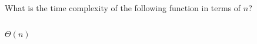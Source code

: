 \begin{prob}
    What is the time complexity of the following function in terms of $n$?

    \inputminted{python}{./code.py}

    \begin{soln}
        $\Theta(n)$
    \end{soln}

\end{prob}
